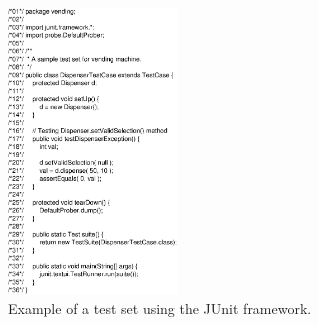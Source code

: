 \begin{figure}[!ht]
\begin{center}
\includegraphics[width=0.4\textwidth]{fig/junit-test-case.eps}
\caption{\label{fig:junit}Example of a test set using the JUnit
framework.}
\end{center}
\end{figure}
